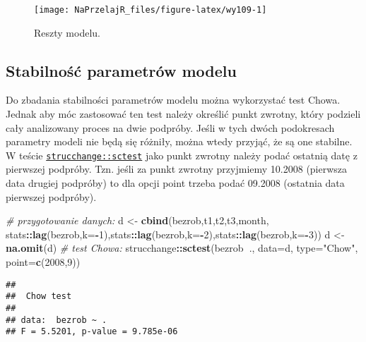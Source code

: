 \documentclass[polish,]{book}
\newenvironment{Shaded}{\begin{snugshade}}{\end{snugshade}}
\newcommand{\CommentTok}[1]{\textcolor[rgb]{0.56,0.35,0.01}{\textit{#1}}}
\newcommand{\DataTypeTok}[1]{\textcolor[rgb]{0.13,0.29,0.53}{#1}}
\newcommand{\DecValTok}[1]{\textcolor[rgb]{0.00,0.00,0.81}{#1}}
\newcommand{\KeywordTok}[1]{\textcolor[rgb]{0.13,0.29,0.53}{\textbf{#1}}}
\newcommand{\NormalTok}[1]{#1}
\newcommand{\OperatorTok}[1]{\textcolor[rgb]{0.81,0.36,0.00}{\textbf{#1}}}
\newcommand{\StringTok}[1]{\textcolor[rgb]{0.31,0.60,0.02}{#1}}
\begin{document}
\begin{figure}[h]

{\centering \texttt{[image: NaPrzelajR\_files/figure-latex/wy109-1]} 

}

\caption{Reszty modelu.}\label{fig:wy109}
\end{figure}

\hypertarget{part_10.4.4}{%
\subsection{Stabilność parametrów modelu}\label{part_10.4.4}}

Do zbadania stabilności parametrów modelu można wykorzystać test Chowa. Jednak aby móc zastosować ten test należy określić punkt zwrotny, który podzieli cały
analizowany proces na dwie podpróby. Jeśli w tych dwóch podokresach parametry modeli nie będą się różniły, można wtedy przyjąć, że są one stabilne. W teście
\href{https://rdrr.io/cran/strucchange/man/sctest.html}{\texttt{strucchange::sctest}} jako punkt zwrotny należy podać ostatnią datę z pierwszej
podpróby. Tzn. jeśli za punkt zwrotny przyjmiemy 10.2008 (pierwsza data drugiej
podpróby) to dla opcji point trzeba podać 09.2008 (ostatnia data pierwszej podpróby).

\begin{Shaded}
\begin{Highlighting}[]
\CommentTok{# przygotowanie danych:}
\NormalTok{d <-}\StringTok{ }\KeywordTok{cbind}\NormalTok{(bezrob,t1,t2,t3,month,}
\NormalTok{  stats}\OperatorTok{::}\KeywordTok{lag}\NormalTok{(bezrob,}\DataTypeTok{k=}\OperatorTok{-}\DecValTok{1}\NormalTok{),stats}\OperatorTok{::}\KeywordTok{lag}\NormalTok{(bezrob,}\DataTypeTok{k=}\OperatorTok{-}\DecValTok{2}\NormalTok{),stats}\OperatorTok{::}\KeywordTok{lag}\NormalTok{(bezrob,}\DataTypeTok{k=}\OperatorTok{-}\DecValTok{3}\NormalTok{))}
\NormalTok{d <-}\StringTok{ }\KeywordTok{na.omit}\NormalTok{(d)}
\CommentTok{# test Chowa:}
\NormalTok{strucchange}\OperatorTok{::}\KeywordTok{sctest}\NormalTok{(bezrob}\OperatorTok{~}\NormalTok{., }\DataTypeTok{data=}\NormalTok{d, }\DataTypeTok{type=}\StringTok{"Chow"}\NormalTok{, }\DataTypeTok{point=}\KeywordTok{c}\NormalTok{(}\DecValTok{2008}\NormalTok{,}\DecValTok{9}\NormalTok{))}
\end{Highlighting}
\end{Shaded}

\begin{verbatim}
## 
##  Chow test
## 
## data:  bezrob ~ .
## F = 5.5201, p-value = 9.785e-06
\end{verbatim}
\end{document}

